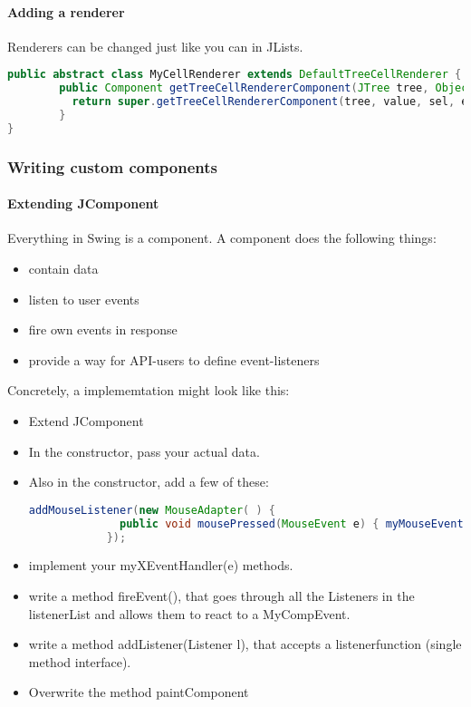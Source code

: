 
 \paragraph{Adding a renderer} Renderers can be changed just like you can in JLists.
 
 \begin{lstlisting}[language=java]
    public abstract class MyCellRenderer extends DefaultTreeCellRenderer {
	    public Component getTreeCellRendererComponent(JTree tree, Object value, boolean sel, boolean expanded, boolean leaf, int row, boolean hasFocus) {
		  return super.getTreeCellRendererComponent(tree, value, sel, expanded, leaf, row, hasFocus);
	    }
}
 \end{lstlisting}
 
 
 
 
 \subsubsection{Writing custom components}
 
 \paragraph{Extending JComponent} Everything in Swing is a component. A component does the following things: 
 \begin{itemize}
    \item contain data
    \item listen to user events
    \item fire own events in response
    \item provide a way for API-users to define event-listeners
 \end{itemize}
 Concretely, a implememtation might look like this: 
 
 \begin{itemize}
    \item Extend JComponent
    \item In the constructor, pass your actual data.
    \item Also in the constructor, add a few of these: 
        \begin{lstlisting}[language=java]
            addMouseListener(new MouseAdapter( ) {
              public void mousePressed(MouseEvent e) { myMouseEventHandler(e); }
            });
        \end{lstlisting}
    \item implement your myXEventHandler(e) methods.
    \item write a method fireEvent(), that goes through all the Listeners in the listenerList and allows them to react to a MyCompEvent. 
    \item write a method addListener(Listener l), that accepts a listenerfunction (single method interface).
    \item Overwrite the method paintComponent
 \end{itemize}
 
